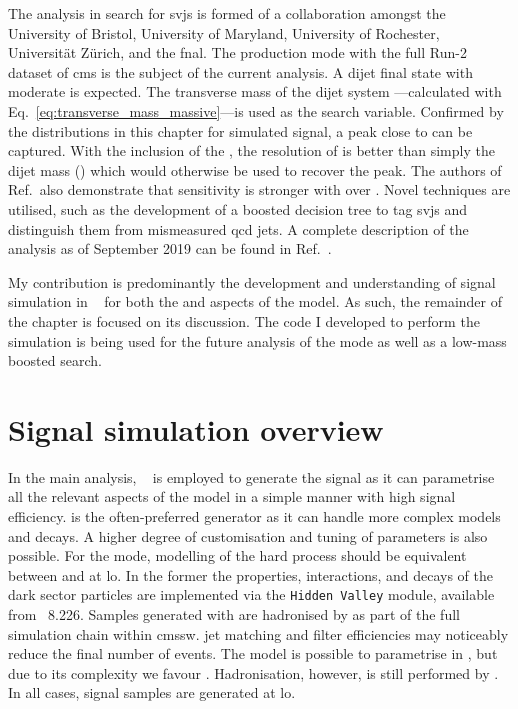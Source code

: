 The analysis in search for \glspl{svj} is formed of a collaboration amongst the University of Bristol, University of Maryland, University of Rochester, Universit\"{a}t Z\"{u}rich, and the \acrfull{fnal}. The \schannel production mode with the full Run-2 dataset of \acrshort{cms} is the subject of the current analysis. A dijet final state with moderate \ptmiss is expected. The transverse mass of the dijet system \mT---calculated with Eq.~\ref{eq:transverse_mass_massive}---is used as the search variable. Confirmed by the distributions in this chapter for simulated signal, a peak close to \mZprime can be captured. With the inclusion of the \ptmiss, the resolution of \mT is better than simply the dijet mass (\mjj) which would otherwise be used to recover the peak. The authors of Ref.~also demonstrate that sensitivity is stronger with \mT over \mjj. Novel techniques are utilised, such as the development of a boosted decision tree to tag \glspl{svj} and distinguish them from mismeasured \acrshort{qcd} \glspl{jet}. A complete description of the \schannel analysis as of September 2019 can be found in Ref.~. %

My contribution is predominantly the development and understanding of signal simulation in \MGvATNLO~\cite{Alwall:2011madgraph} for both the \schannel and \tchannel aspects of the model. As such, the remainder of the chapter is focused on its discussion. The code I developed to perform the simulation is being used for the future analysis of the \tchannel mode as well as a low-mass boosted \PZprime search.




\section{Signal simulation overview}
\label{sec:signal_sim}

In the main analysis, \PYTHIAEIGHT~\cite{pythia82} is employed to generate the \schannel signal as it can parametrise all the relevant aspects of the model in a simple manner with high signal efficiency. \MADGRAPH is the often-preferred generator as it can handle more complex models and decays. A higher degree of customisation and tuning of parameters is also possible. For the \schannel mode, modelling of the hard process should be equivalent between \PYTHIA and \MADGRAPH at \acrfull{lo}. In the former the properties, interactions, and decays of the dark sector particles are implemented via the \texttt{Hidden Valley} module, available from \PYTHIA~8.226. Samples generated with \MADGRAPH are hadronised by \PYTHIA as part of the full simulation chain within \acrshort{cmssw}. \Gls{jet} matching and filter efficiencies may noticeably reduce the final number of events. The \tchannel model is possible to parametrise in \PYTHIA, but due to its complexity we favour \MADGRAPH. Hadronisation, however, is still performed by \PYTHIA. In all cases, signal samples are generated at \acrshort{lo}.


